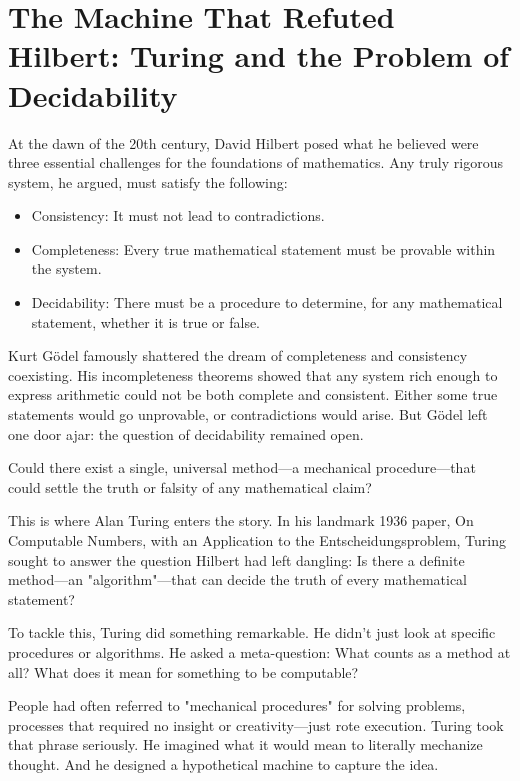 \section{The Machine That Refuted Hilbert: Turing and the Problem of Decidability}

At the dawn of the 20th century, David Hilbert posed what he believed were three essential challenges for the foundations of mathematics. Any truly rigorous system, he argued, must satisfy the following:

\begin{itemize}
    \item Consistency: It must not lead to contradictions.

    \item Completeness: Every true mathematical statement must be provable within the system.

    \item Decidability: There must be a procedure to determine, for any mathematical statement, whether it is true or false.
\end{itemize}

Kurt Gödel famously shattered the dream of completeness and consistency coexisting. His incompleteness theorems showed that any system rich enough to express arithmetic could not be both complete and consistent. Either some true statements would go unprovable, or contradictions would arise. But Gödel left one door ajar: the question of decidability remained open.

Could there exist a single, universal method—a mechanical procedure—that could settle the truth or falsity of any mathematical claim?

This is where Alan Turing enters the story. In his landmark 1936 paper, On Computable Numbers, with an Application to the Entscheidungsproblem, Turing sought to answer the question Hilbert had left dangling: Is there a definite method—an "algorithm"—that can decide the truth of every mathematical statement?

To tackle this, Turing did something remarkable. He didn't just look at specific procedures or algorithms. He asked a meta-question: What counts as a method at all? What does it mean for something to be computable?

People had often referred to "mechanical procedures" for solving problems, processes that required no insight or creativity—just rote execution. Turing took that phrase seriously. He imagined what it would mean to literally mechanize thought. And he designed a hypothetical machine to capture the idea.


